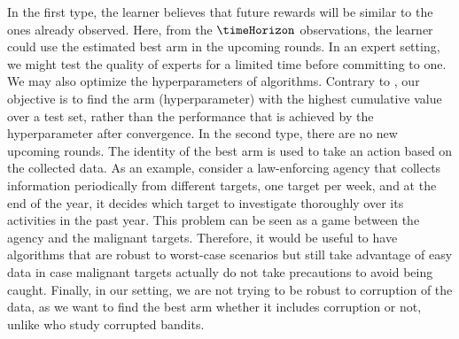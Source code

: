 In the first type, the learner believes that future rewards will be similar to the ones already observed. 
Here, from the $\timeHorizon$ observations, the learner could use the estimated best arm in the upcoming rounds. 
In an expert setting, we might test the quality 
of experts for a limited time before committing to one.
We may also optimize the hyperparameters of algorithms. 
Contrary to \cite{Jamieson16NS}, our objective is to find the 
arm (hyperparameter) with the highest cumulative value over a test set, rather than the performance that is achieved by the hyperparameter after convergence. %
In the second type, there are no new upcoming rounds.
The identity of the best arm is used to take an action based on the collected data.
%
As an example, consider a law-enforcing agency that collects 
information periodically from different targets, one target per week, and at the end of the year, it  
decides which target to investigate 
thoroughly over its activities in the past year.
This problem can 
be seen as a game between the agency and the malignant 
targets. Therefore, it would be useful to have algorithms that are 
robust to worst-case scenarios but still take advantage 
of easy data in case malignant targets actually do not take precautions to avoid being caught. %
%
Finally, in our setting, we are not trying to be robust to 
corruption of the data, as we want to find the best arm whether it includes corruption or not,
 unlike %
\citet{Altschuler18BA} who study corrupted bandits.
%
%